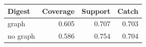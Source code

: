 \begin{tabular}{lrrr}
\toprule
Digest & Coverage & Support & Catch \\
\midrule
graph & 0.605 & 0.707 & 0.703 \\
no graph & 0.586 & 0.754 & 0.704 \\
\bottomrule
\end{tabular}

